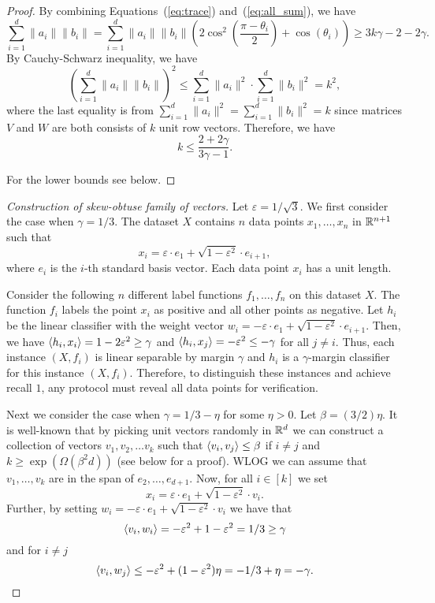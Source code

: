 \begin{proof}
    By combining Equations~(\ref{eq:trace}) and~(\ref{eq:all_sum}), we have 
    $$
    \sum_{i=1}^d \|a_i\|\|b_i\| = \sum_{i=1}^d \|a_i\|\|b_i\| \left(2\cos^2\left(\frac{\pi-\theta_i}{2}\right) + \cos(\theta_i)\right) \geq 3k\gamma -2 - 2\gamma.
    $$
    By Cauchy-Schwarz inequality, we have 
    $$
    \left(\sum_{i=1}^d \|a_i\|\|b_i\| \right)^2 \leq \sum_{i=1}^d \|a_i\|^2 \cdot \sum_{i=1}^d \|b_i\|^2 = k^2,
    $$
    where the last equality is from $\sum_{i=1}^d \|a_i\|^2 = \sum_{i=1}^d \|b_i\|^2 = k$ since matrices $V$ and $W$ are both consists of $k$ unit row vectors. Therefore, we have 
    $$
    k \leq \frac{2+2\gamma}{3\gamma-1}.
    $$

    For the lower bounds see below.
\end{proof}

\begin{proof}[Construction of skew-obtuse family of vectors]
     Let $\varepsilon = 1/\sqrt{3}$.
    We first consider the case when $\gamma =1/3$.
   The dataset $X$ contains $n$ data points $x_1,\dots,x_n$ in $\mathbb{R}^{n+1}$ such that 
    $$
    x_i = \varepsilon \cdot e_1 + \sqrt{1-\varepsilon^2} \cdot e_{i+1},
    $$
    where $e_i$ is the $i$-th standard basis vector. Each data point $x_i$ has a unit length. 

    Consider the following $n$ different label functions $f_1,\dots, f_n$ on this dataset $X$. The function $f_i$ labels the point $x_i$ as positive and all other points as negative. 
    Let $h_i$ be the linear classifier with the weight vector $w_i = -\varepsilon \cdot e_1 + \sqrt{1-\varepsilon^2} \cdot e_{i+1}$. Then, we have $\langle h_i, x_i\rangle = 1-2\varepsilon^2  \geq \gamma$ and $\langle h_i, x_j\rangle = -\varepsilon^2  \leq -\gamma$ for all $j \neq i$. 
    Thus, each instance $(X,f_i)$ is linear separable by margin $\gamma$ and $h_i$ is a $\gamma$-margin classifier for this instance $(X,f_i)$. Therefore, to distinguish these instances and achieve recall $1$, any protocol must reveal all data points for verification.

    Next we consider the case when $\gamma = 1/3 - \eta$ for some $\eta >0$.
    Let $\beta = (3/2)\eta$.
    It is well-known that by picking unit vectors randomly in $\mathbb{R}^d$ we can construct a collection of vectors $v_1, v_2, \ldots v_k$ such that $\langle v_i, v_j\rangle \leq \beta$ if $i\neq j$ and $k\geq \exp{(\Omega(\beta^2 d))}$ (see  below for a proof). 
    WLOG we can assume that $v_1,\ldots,v_k$ are in the span of $e_2,\ldots,e_{d+1}$. Now, for all $i\in [k]$ we set 
    $$
    x_i = \varepsilon \cdot e_1 + \sqrt{1-\varepsilon^2} \cdot v_{i}.
    $$
    Further, by setting $w_i = -\varepsilon \cdot e_1 + \sqrt{1-\varepsilon^2} \cdot v_i$ we have that 
    \[
    \langle v_i, w_i\rangle = -\varepsilon^2 + 1 - \varepsilon^2 = 1/3 \geq \gamma
    \]
    and for $i\neq j$
    \[
    \langle v_i, w_j\rangle \leq -\varepsilon^2 + (1 - \varepsilon^2)\eta = -1/3 + \eta = -\gamma.
    \]
\end{proof}